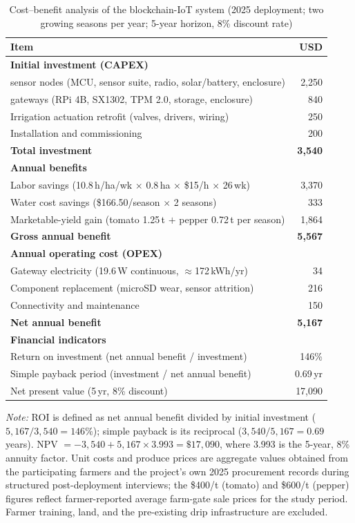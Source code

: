 \documentclass[pdflatex,sn-mathphys-num]{sn-jnl}
\theoremstyle{thmstyleone}
\theoremstyle{thmstyletwo}
\theoremstyle{thmstylethree}
\begin{document}
\begin{table}[htbp]
\centering
\caption{Cost--benefit analysis of the blockchain-IoT system (2025 deployment; two growing seasons per year; 5-year horizon, 8\% discount rate)}
\label{tab:economic-analysis}
\footnotesize
\begin{tabularx}{\columnwidth}{>{\raggedright\arraybackslash}X r}
\toprule
\textbf{Item} & \textbf{USD} \\
\midrule
\textbf{Initial investment (CAPEX)} & \\
\quad 50 sensor nodes (MCU, sensor suite, radio, solar/battery, enclosure) & 2,250 \\
\quad 4 gateways (RPi 4B, SX1302, TPM 2.0, storage, enclosure) & 840 \\
\quad Irrigation actuation retrofit (valves, drivers, wiring) & 250 \\
\quad Installation and commissioning & 200 \\
\quad \textbf{Total investment} & \textbf{3,540} \\
\midrule
\textbf{Annual benefits} & \\
\quad Labor savings (10.8\,h/ha/wk $\times$ 0.8\,ha $\times$ \$15/h $\times$ 26\,wk) & 3,370 \\
\quad Water cost savings (\$166.50/season $\times$ 2 seasons) & 333 \\
\quad Marketable-yield gain (tomato 1.25\,t $+$ pepper 0.72\,t per season) & 1,864 \\
\quad \textbf{Gross annual benefit} & \textbf{5,567} \\
\midrule
\textbf{Annual operating cost (OPEX)} & \\
\quad Gateway electricity (19.6\,W continuous, $\approx$172\,kWh/yr) & 34 \\
\quad Component replacement (microSD wear, sensor attrition) & 216 \\
\quad Connectivity and maintenance & 150 \\
\quad \textbf{Net annual benefit} & \textbf{5,167} \\
\midrule
\textbf{Financial indicators} & \\
\quad Return on investment (net annual benefit / investment) & 146\% \\
\quad Simple payback period (investment / net annual benefit) & 0.69\,yr \\
\quad Net present value (5\,yr, 8\% discount) & 17,090 \\
\bottomrule
\end{tabularx}
{\footnotesize \textit{Note:} ROI is defined as net annual benefit divided by initial investment ($5{,}167/3{,}540 = 146\%$); simple payback is its reciprocal ($3{,}540/5{,}167 = 0.69$ years). NPV $= -3{,}540 + 5{,}167 \times 3.993 = \$17{,}090$, where 3.993 is the 5-year, 8\% annuity factor. Unit costs and produce prices are aggregate values obtained from the participating farmers and the project's own 2025 procurement records during structured post-deployment interviews; the \$400/t (tomato) and \$600/t (pepper) figures reflect farmer-reported average farm-gate sale prices for the study period. Farmer training, land, and the pre-existing drip infrastructure are excluded.}
\end{table}
\end{document}
